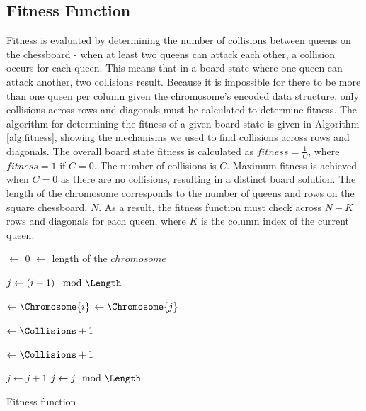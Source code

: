 \documentclass[conference]{IEEEtran}
\begin{document}
\subsection{Fitness Function}
Fitness is evaluated by determining the number of collisions between queens on the chessboard - when at least two queens can attack each other, a collision occurs for each queen. This means that in a board state where one queen can attack another, two collisions result. Because it is impossible for there to be more than one queen per column given the chromosome's encoded data structure, only collisions across rows and diagonals must be calculated to determine fitness. The algorithm for determining the fitness of a given board state is given in Algorithm \ref{alg:fitness}, showing the mechanisms we used to find collisions across rows and diagonals. The overall board state fitness is calculated as $fitness = \frac{1}{C}$, where $fitness = 1$ if $C = 0$. The number of collisions is $C$. Maximum fitness is achieved when $C = 0$ as there are no collisions, resulting in a distinct board solution. The length of the chromosome corresponds to the number of queens and rows on the square chessboard, $N$. As a result, the fitness function must check across $N - K$ rows and diagonals for each queen, where $K$ is the column index of the current queen.
 
\begin{algorithm}[t!]
  \SetAlgoLined
  \DontPrintSemicolon
  
  {
    \BlankLine
    
    \Collisions $\leftarrow$ 0\;
    \Length $\leftarrow$ length of the $chromosome$\;
    \BlankLine
    
    {
      $j \leftarrow \left( i + 1 \right) \mod{\Length}$\;
      {
        \Yi $\leftarrow \Chromosome{i}$\;
        \Yj $\leftarrow \Chromosome{j}$\;
        \BlankLine
        
        \If{\Yi == \Yj}
        {
          \Collisions $\leftarrow \Collisions + 1$\; 
        }
        \BlankLine
        
        {
          \Collisions $\leftarrow \Collisions + 1$\;
        }
        \BlankLine
        
        $j \leftarrow j + 1$\;
        $j \leftarrow j \mod{\Length}$\;
      }
    }
    \BlankLine

    {
      \;
    }
    {
      \;
    }
  }
\caption{Fitness function}
\label{alg:fitness}
\end{algorithm}
\end{document}
